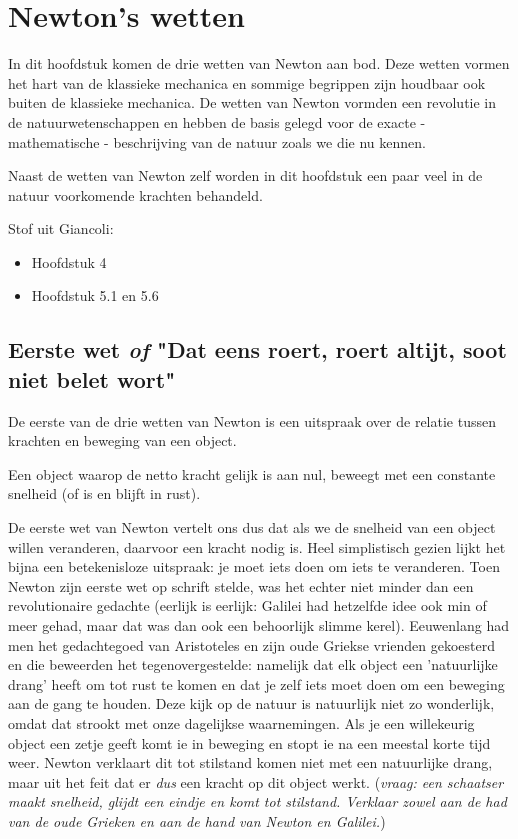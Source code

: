 
\chapter{Newton's wetten}\label{chap:newton}

In dit hoofdstuk komen de drie wetten van Newton aan bod. Deze wetten vormen het hart
van de klassieke mechanica en sommige begrippen zijn houdbaar ook buiten
de klassieke mechanica. De wetten van Newton vormden een revolutie in de
natuurwetenschappen en hebben de basis gelegd voor de exacte - mathematische - beschrijving
van de natuur zoals we die nu kennen.

Naast de wetten van Newton zelf worden in dit hoofdstuk een paar veel in de natuur 
voorkomende krachten behandeld.

Stof uit Giancoli:
\begin{itemize}
\item Hoofdstuk 4
\item Hoofdstuk 5.1 en 5.6
\end{itemize}

\section{Eerste wet {\it of }  "Dat eens roert, roert altijt, soot niet belet wort"}\label{sec:newton1}

De eerste van de drie wetten van Newton is een uitspraak over de relatie tussen krachten en
beweging van een object. 

\begin{Newton1}
Een object waarop de netto kracht gelijk is aan nul, beweegt met een constante snelheid (of is en blijft in rust).
\end{Newton1}

De eerste wet van Newton vertelt ons dus dat als we de snelheid van een object willen 
veranderen, daarvoor een kracht nodig is. Heel simplistisch gezien lijkt het bijna
een betekenisloze uitspraak: je moet iets doen om iets te veranderen. Toen Newton
zijn eerste wet op schrift stelde, was het echter niet minder dan een revolutionaire gedachte
(eerlijk is eerlijk: Galilei had hetzelfde idee ook min of meer gehad, maar dat was dan ook
een behoorlijk slimme kerel). Eeuwenlang had men het gedachtegoed van Aristoteles en zijn 
oude Griekse vrienden gekoesterd en die beweerden het tegenovergestelde: namelijk dat
elk object een 'natuurlijke drang' heeft om tot rust te komen en dat je zelf iets moet doen
om een beweging aan de gang te houden.  Deze kijk op de natuur is natuurlijk niet zo wonderlijk, 
omdat dat strookt met onze dagelijkse waarnemingen. Als je een willekeurig object een zetje geeft 
komt ie in beweging en stopt ie na een meestal korte tijd weer. Newton verklaart dit tot stilstand
komen niet met een natuurlijke drang, maar uit het feit dat er {\it dus} een kracht op dit object werkt.
({\it vraag: een schaatser maakt snelheid, glijdt een eindje en komt tot stilstand. Verklaar zowel 
aan de had van de oude Grieken en aan de hand van Newton en Galilei.})

